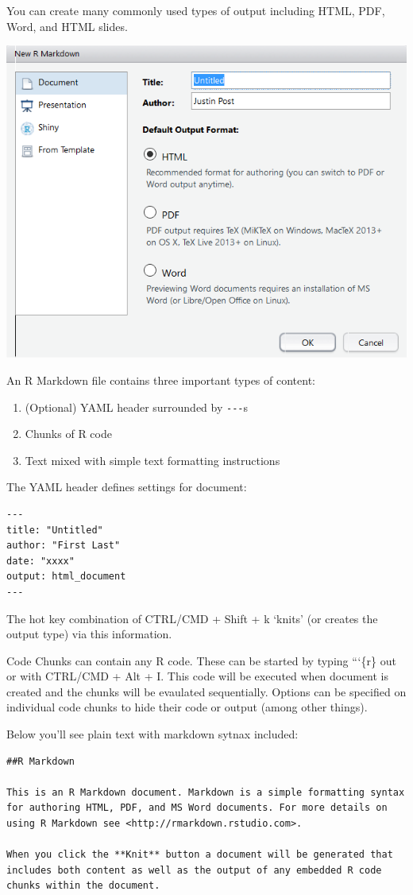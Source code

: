 \documentclass[
]{book}
\theoremstyle{definition}
\theoremstyle{definition}
\theoremstyle{definition}
\theoremstyle{remark}
\begin{document}
You can create many commonly used types of output including HTML, PDF, Word, and HTML slides.

\begin{center}\includegraphics[width=0.65\linewidth]{img/startMDDoc} \end{center}

An R Markdown file contains three important types of content:

\begin{enumerate}
\def\labelenumi{\arabic{enumi}.}
\item
  (Optional) YAML header surrounded by \texttt{-\/-\/-}s
\item
  Chunks of R code
\item
  Text mixed with simple text formatting instructions
\end{enumerate}

The YAML header defines settings for document:

\begin{verbatim}
---
title: "Untitled"
author: "First Last"
date: "xxxx"
output: html_document
---
\end{verbatim}

The hot key combination of CTRL/CMD + Shift + k `knits' (or creates the output type) via this information.

Code Chunks can contain any R code. These can be started by typing ```\{r\} out or with CTRL/CMD + Alt + I. This code will be executed when document is created and the chunks will be evaulated sequentially. Options can be specified on individual code chunks to hide their code or output (among other things).

Below you'll see plain text with markdown sytnax included:

\begin{verbatim}
##R Markdown

This is an R Markdown document. Markdown is a simple formatting syntax
for authoring HTML, PDF, and MS Word documents. For more details on
using R Markdown see <http://rmarkdown.rstudio.com>.

When you click the **Knit** button a document will be generated that
includes both content as well as the output of any embedded R code
chunks within the document. 
\end{verbatim}
\end{document}
